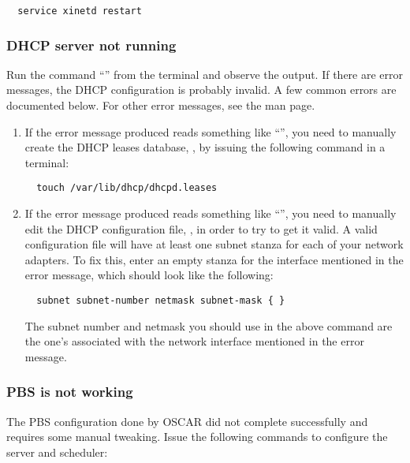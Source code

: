 \begin{verbatim}
  service xinetd restart
\end{verbatim}

\subsubsection{DHCP server not running}

Run the command ``'' from the terminal and
observe the output. If there are error messages, the DHCP
configuration is probably invalid. A few common errors are documented
below. For other error messages, see the  man page.

\begin{enumerate}
\item If the error message produced reads something like
  ``'', you need to manually create
  the DHCP leases database, , by
  issuing the following command in a terminal:

\begin{verbatim}
  touch /var/lib/dhcp/dhcpd.leases
\end{verbatim}
  
\item If the error message produced reads something like ``'', you need to manually edit the DHCP
  configuration file, , in order to try to get
  it valid. A valid configuration file will have at least one subnet
  stanza for each of your network adapters. To fix this, enter an
  empty stanza for the interface mentioned in the error message, which
  should look like the following:

\begin{verbatim}
  subnet subnet-number netmask subnet-mask { }
\end{verbatim}
  
  The subnet number and netmask you should use in the above command
  are the one's associated with the network interface mentioned in the
  error message.
\end{enumerate}

\subsubsection{PBS is not working}

The PBS configuration done by OSCAR did not complete successfully and
requires some manual tweaking. Issue the following commands to
configure the server and scheduler:

